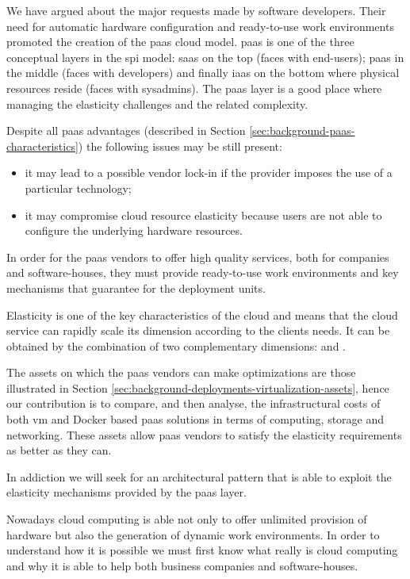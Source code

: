 We have argued about the major requests made by software developers. Their need for automatic
hardware configuration and ready-to-use work environments promoted the creation of the \ac{paas} 
cloud model. \ac{paas} is one of the three conceptual layers in the \ac{spi} model: \ac{saas} on the
top (faces with end-users); \ac{paas} in the middle (faces with developers) and finally \ac{iaas} on
the bottom where physical resources reside (faces with sysadmins). The \ac{paas} layer is a good place
where managing the elasticity challenges and the related complexity. 

Despite all \ac{paas} advantages (described in Section \ref{sec:background-paas-characteristics})
the following issues may be still present:

\begin{itemize}
	\item{it may lead to a possible vendor lock-in if the provider imposes the use of a particular
		technology;}
	\item{it may compromise cloud resource elasticity because users are not able to configure the
		underlying hardware resources.}
\end{itemize}

In order for the \ac{paas} vendors to offer high quality services, both for companies and software-houses,
they must provide ready-to-use work environments and key mechanisms that guarantee 
for the deployment units.

Elasticity is one of the key characteristics of the cloud and means that the cloud service can rapidly
scale its dimension according to the clients needs. It can be obtained by the combination of two complementary
dimensions:  and .

The assets on which the \ac{paas} vendors can make optimizations are those illustrated in Section
\ref{sec:background-deployments-virtualization-assets}, hence our contribution is to compare, and then analyse,
the infrastructural costs of both \ac{vm} and Docker based \ac{paas} solutions in terms of computing, storage and
networking. These assets allow \ac{paas} vendors to satisfy the elasticity requirements as better as they can.

In addiction we will seek for an architectural pattern that is able to exploit the elasticity mechanisms 
provided by the \ac{paas} layer.

Nowadays cloud computing is able not only to offer unlimited provision of hardware but also the generation
of dynamic work environments. In order to understand how it is possible we must first know what really is
cloud computing and why it is able to help both business companies and software-houses.